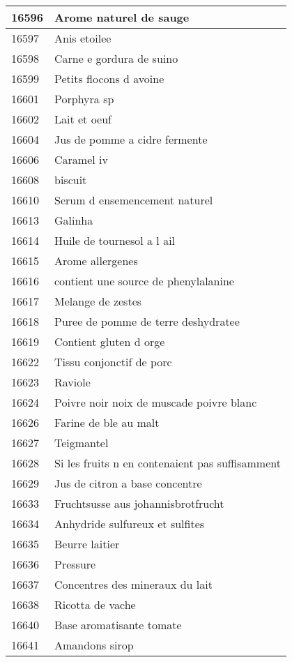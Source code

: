 \begin{longtable}{|l|l|}
16596 & Arome naturel de sauge \\ \hline 
16597 & Anis etoilee \\ \hline 
16598 & Carne e gordura de suino \\ \hline 
16599 & Petits flocons d avoine \\ \hline 
16601 & Porphyra sp \\ \hline 
16602 & Lait et oeuf \\ \hline 
16604 & Jus de pomme a cidre fermente \\ \hline 
16606 & Caramel iv \\ \hline 
16608 & biscuit \\ \hline 
16610 & Serum d ensemencement naturel \\ \hline 
16613 & Galinha \\ \hline 
16614 & Huile de tournesol a l ail \\ \hline 
16615 & Arome allergenes \\ \hline 
16616 & contient une source de phenylalanine \\ \hline 
16617 & Melange de zestes \\ \hline 
16618 & Puree de pomme de terre deshydratee \\ \hline 
16619 & Contient gluten d orge \\ \hline 
16622 & Tissu conjonctif de porc \\ \hline 
16623 & Raviole \\ \hline 
16624 & Poivre noir noix de muscade poivre blanc \\ \hline 
16626 & Farine de ble au malt \\ \hline 
16627 & Teigmantel \\ \hline 
16628 & Si les fruits n en contenaient pas suffisamment \\ \hline 
16629 & Jus de citron a base concentre \\ \hline 
16633 & Fruchtsusse aus johannisbrotfrucht \\ \hline 
16634 & Anhydride sulfureux et sulfites \\ \hline 
16635 & Beurre laitier \\ \hline 
16636 & Pressure \\ \hline 
16637 & Concentres des mineraux du lait \\ \hline 
16638 & Ricotta de vache \\ \hline 
16640 & Base aromatisante tomate \\ \hline 
16641 & Amandons sirop \\ \hline 

\end{longtable}
